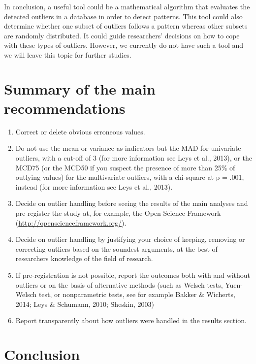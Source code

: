 \documentclass[man,floatsintext]{apa6}
\providecommand{\tightlist}{%
  \setlength{\itemsep}{0pt}\setlength{\parskip}{0pt}}
\begin{document}
In conclusion, a useful tool could be a mathematical algorithm that evaluates the detected outliers in a database in order to detect patterns. This tool could also determine whether one subset of outliers follows a pattern whereas other subsets are randomly distributed. It could guide researchers' decisions on how to cope with these types of outliers. However, we currently do not have such a tool and we will leave this topic for further studies.

\hypertarget{summary-of-the-main-recommendations}{%
\section{Summary of the main recommendations}\label{summary-of-the-main-recommendations}}

\begin{enumerate}
\def\labelenumi{\arabic{enumi})}
\tightlist
\item
  Correct or delete obvious erroneous values.
\item
  Do not use the mean or variance as indicators but the MAD for univariate outliers, with a cut-off of 3 (for more information see Leys et al., 2013), or the MCD75 (or the MCD50 if you suspect the presence of more than 25\% of outlying values) for the multivariate outliers, with a chi-square at p = .001, instead (for more information see Leys et al., 2013).
\item
  Decide on outlier handling before seeing the results of the main analyses and pre-register the study at, for example, the Open Science Framework (\url{http://openscienceframework.org/}).
\item
  Decide on outlier handling by justifying your choice of keeping, removing or correcting outliers based on the soundest arguments, at the best of researchers knowledge of the field of research.
\item
  If pre-registration is not possible, report the outcomes both with and without outliers or on the basis of alternative methods (such as Welsch tests, Yuen-Welsch test, or nonparametric tests, see for example Bakker \& Wicherts, 2014; Leys \& Schumann, 2010; Sheskin, 2003)
\item
  Report transparently about how outliers were handled in the results section.
\end{enumerate}

\hypertarget{conclusion}{%
\section{Conclusion}\label{conclusion}}
\end{document}
